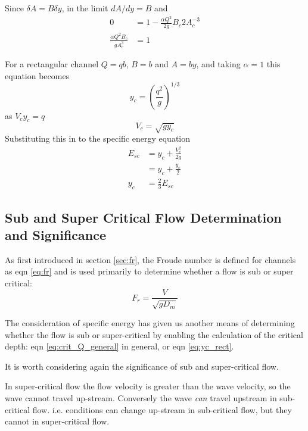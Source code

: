 \documentclass[a4paper, 12pt, british]{article} %
\numberwithin{equation}{section}
\numberwithin{figure}{section}
\numberwithin{table}{section}
\begin{document}
Since  $\delta A = B \delta y$, in the limit $dA/dy = B$ and
\begin{align}
0 &= 1 - \frac{\alpha Q^2}{2g}B_c 2 A_c^{-3}  \nonumber \\
\frac{\alpha Q^2 B_c}{gA_c^{3}} &= 1
\label{eq:crit_Q_general} %
\end{align}


For a rectangular channel $Q = qb$, $B = b$ and $A = by$, and taking $\alpha = 1$ this equation becomes
\begin{equation}
y_c = \left(\frac{q^2}{g}\right)^{1/3}
\label{eq:yc_rect}
\end{equation}
as $V_c y_c= q$
\begin{equation}
V_c = \sqrt{gy_c}
\label{eq:crit_vel} %
\end{equation}
Substituting this in to the specific energy equation
\begin{align}
E_{sc} &= y_c + \frac{V_c^2}{2g} \nonumber \\
       &= y_c + \frac{y_c}{2} \nonumber \\
y_c &= \frac{2}{3}E_{sc}
\label{eq:ycrit_esc} %
\end{align}
 
\subsection{Sub and Super Critical Flow Determination and Significance}
\label{sec:fr2}

As first introduced in section \ref{sec:fr}, the Froude number is defined for channels as eqn \ref{eq:fr} and is used primarily to determine whether a flow is sub or super critical:
\begin{equation*}
F_r = \frac{V}{\sqrt{gD_m}}
\label{eq:fr_v2}
\end{equation*} 

The consideration of specific energy has given us another means of determining whether the flow is sub or super-critical by enabling the calculation of the critical depth: eqn \ref{eq:crit_Q_general} in general, or eqn \ref{eq:yc_rect}.

It is worth considering again the significance of sub and super-critical flow.

In super-critical flow the flow velocity is greater than the wave velocity, so the wave cannot travel up-stream. Conversely the wave \textit{can} travel upstream in sub-critical flow. i.e. conditions can change up-stream in sub-critical flow, but they cannot in super-critical flow.
\end{document}
